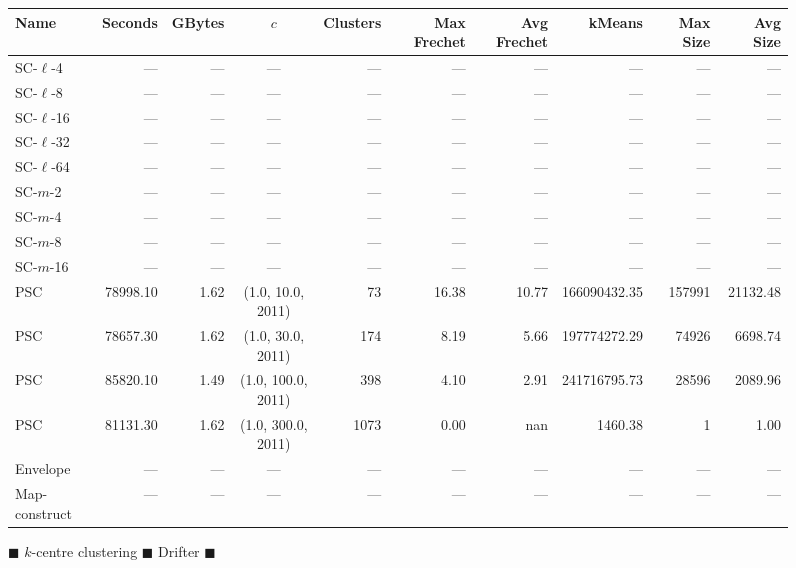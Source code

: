 \documentclass[11pt]{article}
\begin{document}
    \begin{figure} \begin{center}
        \begin{minipage}{\textwidth}
    {
    \begin{tabular}{@{}lrrcrrrrrr@{}}
        \toprule
        Name & Seconds & GBytes & $c$ & Clusters & Max Frechet & Avg Frechet & kMeans & Max Size & Avg Size\\
        \midrule
                        SC-$\ell$-4 & --- & --- & --- & --- & --- & --- & --- & --- & ---\\
SC-$\ell$-8 & --- & --- & --- & --- & --- & --- & --- & --- & ---\\
SC-$\ell$-16 & --- & --- & --- & --- & --- & --- & --- & --- & ---\\
SC-$\ell$-32& --- & --- & --- & --- & --- & --- & --- & --- & ---\\
SC-$\ell$-64 & --- & --- & --- & --- & --- & --- & --- & --- & ---\\
SC-$m$-2 & --- & --- & --- & --- & --- & --- & --- & --- & ---\\
SC-$m$-4 & --- & --- & --- & --- & --- & --- & --- & --- & ---\\
SC-$m$-8 & --- & --- & --- & --- & --- & --- & --- & --- & ---\\
SC-$m$-16 & --- & --- & --- & --- & --- & --- & --- & --- & ---\\
        PSC & 78998.10 & 1.62 & (1.0, 10.0, 2011) & 73 & 16.38 & 10.77 & 166090432.35 & 157991 & 21132.48\\
PSC & 78657.30 & 1.62 & (1.0, 30.0, 2011) & 174 & 8.19 & 5.66 & 197774272.29 & 74926 & 6698.74\\
PSC & 85820.10 & 1.49 & (1.0, 100.0, 2011) & 398 & 4.10 & 2.91 & 241716795.73 & 28596 & 2089.96\\
PSC & 81131.30 & 1.62 & (1.0, 300.0, 2011) & 1073 & 0.00 & nan & 1460.38 & 1 & 1.00\\
        Envelope & --- & --- & --- & --- & --- & --- & --- & --- & ---\\
Map-construct & --- & --- & --- & --- & --- & --- & --- & --- & ---\\
        \bottomrule
    \end{tabular}
    }
\end{minipage}
\end{center}
        \caption{$\blacksquare$ $k$-centre clustering $\blacksquare$ Drifter $\blacksquare$}
 \end{figure}
\end{document}
